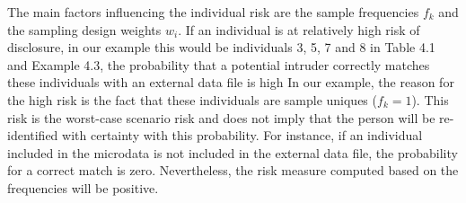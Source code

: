 \documentclass[letterpaper,10pt,english]{sphinxmanual}
\begin{document}
\begin{sphinxVerbatim}[commandchars=\\\{\}]
 \PYG{p}{[}\PYG{p}{]}\PYGZbs{} \PYGZbs{} \PYGZbs{} 
 \PYG{p}{[}\PYG{p}{]}\PYGZbs{} \PYGZbs{} \PYGZbs{} 
 \PYG{p}{[}\PYG{p}{]}\PYGZbs{} \PYGZbs{} \PYGZbs{} 
\end{sphinxVerbatim}

The main factors influencing the individual risk are the sample
frequencies \(f_{k}\) and the sampling design weights \(w_{i}\).
If an individual is at relatively high risk of disclosure, in our
example this would be individuals 3, 5, 7 and 8 in Table 4.1 and Example
4.3, the probability that a potential intruder correctly matches these
individuals with an external data file is high  In our example, the reason for the
high risk is the fact that these individuals are sample uniques
(\(f_{k} = 1\)). This risk is the worst-case scenario risk and does
not imply that the person will be re-identified with certainty with this
probability. For instance, if an individual included in the microdata is
not included in the external data file, the probability for a correct
match is zero. Nevertheless, the risk measure computed based on the
frequencies will be positive.
\end{document}
